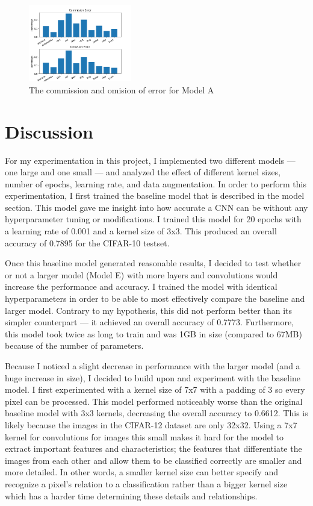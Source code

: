 \documentclass[11pt,a4paper]{article}
\begin{document}
\begin{figure}
  \centering
  \includegraphics[width=0.40\textwidth]{figures/commission_omision.png}
  \caption{The commission and omision of error for Model A}
  \label{fig:commission_omision}
\end{figure}



\section{Discussion}

For my experimentation in this project, I implemented two different models --- one large and one small --- and 
 analyzed the effect of different kernel sizes, number of epochs, learning rate, and data augmentation. 
 In order to perform this experimentation, I first trained the baseline model that is described in the model section. 
 This model gave me insight into how accurate a CNN can be without any hyperparameter tuning or modifications. 
 I trained this model for 20 epochs with a learning rate of 0.001 and a kernel size of 3x3. This produced an overall 
 accuracy of 0.7895 for the CIFAR-10 testset. 

Once this baseline model generated reasonable results, I decided to test whether or not a larger model (Model E) with 
 more layers and convolutions would increase the performance and accuracy. I trained the model with identical hyperparameters
  in order to be able to most effectively compare the baseline and larger model. Contrary to my hypothesis, this did not perform
   better than its simpler counterpart --- it achieved an overall accuracy of 0.7773. Furthermore, this model took twice as long
    to train and was 1GB in size (compared to 67MB) because of the number of parameters. 

Because I noticed a slight decrease in performance with the larger model (and a huge increase in size), I decided to build upon and experiment
 with the baseline model. I first experimented with a kernel size of 7x7 with a padding of 3 so every pixel can be processed.
  This model performed noticeably worse than the original baseline model with 3x3 kernels, decreasing the overall accuracy to 0.6612.
   This is likely because the images in the CIFAR-12 dataset are only 32x32. Using a 7x7 kernel for convolutions for images this 
   small makes it hard for the model to extract important features and characteristics; the features that differentiate the images
    from each other and allow them to be classified correctly are smaller and more detailed. In other words, a smaller kernel size 
    can better specify and recognize a pixel's relation to a classification rather than a bigger kernel size which has a harder 
    time determining these details and relationships.
\end{document}
